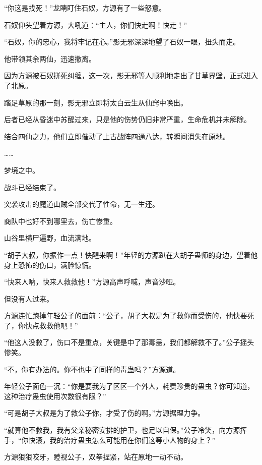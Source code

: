 
\begin{this_body}



“你这是找死！”龙睛盯住石奴，方源有了一些怒意。

石奴仰头望着方源，大吼道：“主人，你们快走啊！快走！”

“石奴，你的忠心，我将牢记在心。”影无邪深深地望了石奴一眼，扭头而走。

他带领其余两仙，迅速撤离。

因为方源被石奴拼死纠缠，这一次，影无邪等人顺利地走出了甘草界壁，正式进入了北原。

踏足草原的那一刻，影无邪立即将太白云生从仙窍中唤出。

后者已经从昏迷中苏醒过来，只是他的伤势仍旧非常严重，生命危机并未解除。

结合四仙之力，他们立即催动了上古战阵四通八达，转瞬间消失在原地。

……

梦境之中。

战斗已经结束了。

突袭攻击的魔道山贼全部交代了性命，无一生还。

商队中也好不到哪里去，伤亡惨重。

山谷里横尸遍野，血流满地。

“胡子大叔，你振作一点！快醒来啊！”年轻的方源趴在大胡子蛊师的身边，望着他身上恐怖的伤口，满脸惊慌。

“快来人呐，快来人救救他！”方源高声呼喊，声音沙哑。

但没有人过来。

方源连忙跑掉年轻公子的面前：“公子，胡子大叔是为了救你而受伤的，他快要死了，你快点救救他吧！”

“他这人没救了，伤口不是重点，关键是中了那毒蛊，我们都解救不了。”公子摇头惨笑。

“不，你有办法的。你不也中了同样的毒蛊吗？”方源道。

年轻公子面色一沉：“你是要我为了区区一个外人，耗费珍贵的蛊虫？你可知道，这种治疗蛊虫使用次数很有限？”

“可是胡子大叔是为了救公子你，才受了伤的啊。”方源据理力争。

“就算他不救我，我有父亲秘密安排的护卫，也足以自保。”公子冷笑，向方源挥手，“你快滚，我的治疗蛊虫怎么可能用在你们这等小人物的身上？”

方源狠狠咬牙，瞪视公子，双拳捏紧，站在原地一动不动。


\end{this_body}
